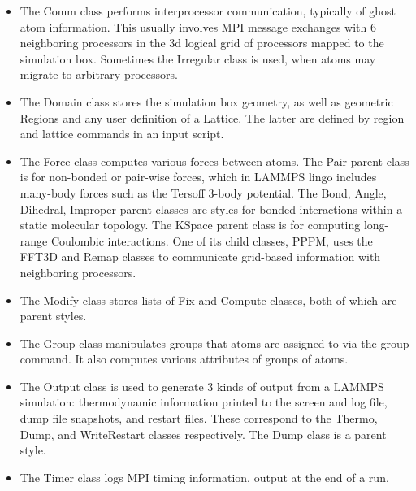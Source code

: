 \documentclass{article}
\begin{document}
\begin{itemize}
\item The Comm class performs interprocessor communication, typically
  of ghost atom information.  This usually involves MPI message
  exchanges with 6 neighboring processors in the 3d logical grid of
  processors mapped to the simulation box.  Sometimes the Irregular
  class is used, when atoms may migrate to arbitrary processors.

\item The Domain class stores the simulation box geometry, as well as
  geometric Regions and any user definition of a Lattice.  The latter
  are defined by region and lattice commands in an input script.

\item The Force class computes various forces between atoms.  The Pair
  parent class is for non-bonded or pair-wise forces, which in LAMMPS
  lingo includes many-body forces such as the Tersoff 3-body
  potential.  The Bond, Angle, Dihedral, Improper parent classes are
  styles for bonded interactions within a static molecular topology.
  The KSpace parent class is for computing long-range Coulombic
  interactions.  One of its child classes, PPPM, uses the FFT3D and
  Remap classes to communicate grid-based information with neighboring
  processors.

\item The Modify class stores lists of Fix and Compute classes, both
  of which are parent styles.

\item The Group class manipulates groups that atoms are assigned to
  via the group command.  It also computes various attributes of
  groups of atoms.

\item The Output class is used to generate 3 kinds of output from a
  LAMMPS simulation: thermodynamic information printed to the screen
  and log file, dump file snapshots, and restart files.  These
  correspond to the Thermo, Dump, and WriteRestart classes
  respectively.  The Dump class is a parent style.

\item The Timer class logs MPI timing information, output at the end
  of a run.

\end{itemize}

\end{document}
